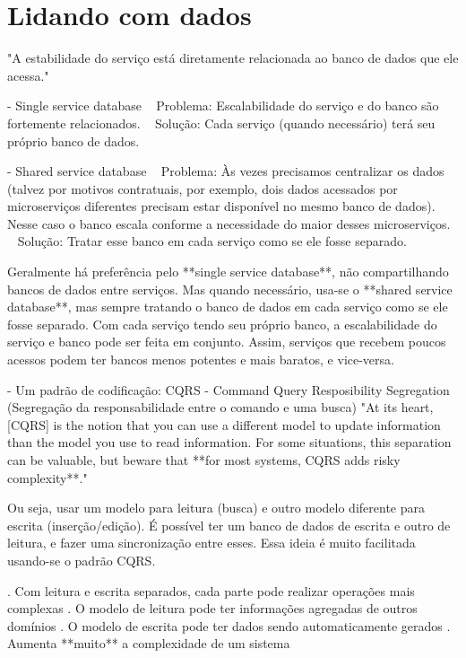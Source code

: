 \section{Lidando com dados}

"A estabilidade do serviço está diretamente relacionada ao banco de dados que ele acessa."

        - Single service database
            ~ Problema: Escalabilidade do serviço e do banco são fortemente relacionados.
            ~ Solução: Cada serviço (quando necessário) terá seu próprio banco de dados.

        - Shared service database
            ~ Problema: Às vezes precisamos centralizar os dados (talvez por motivos contratuais, por exemplo, dois dados acessados por microserviços diferentes precisam estar disponível no mesmo banco de dados). Nesse caso o banco escala conforme a necessidade do maior desses microserviços.
            ~ Solução: Tratar esse banco em cada serviço como se ele fosse separado.

        Geralmente há preferência pelo **single service database**, não compartilhando bancos de dados entre serviços. Mas quando necessário, usa-se o **shared service database**, mas sempre tratando o banco de dados em cada serviço como se ele fosse separado.
        Com cada serviço tendo seu próprio banco, a escalabilidade do serviço e banco pode ser feita em conjunto. Assim, serviços que recebem poucos acessos podem ter bancos menos potentes e mais baratos, e vice-versa.

        - Um padrão de codificação: CQRS - Command Query Resposibility Segregation (Segregação da responsabilidade entre o comando e uma busca)
            "At its heart, [CQRS] is the notion that you can use a different model to update information than the model you use to read information. For some situations, this separation can be valuable, but beware that **for most systems, CQRS adds risky complexity**."

           Ou seja, usar um modelo para leitura (busca) e outro modelo diferente para escrita (inserção/edição). É possível ter um banco de dados de escrita e outro de leitura, e fazer uma sincronização entre esses. Essa ideia é muito facilitada usando-se o padrão CQRS.
           
           . Com leitura e escrita separados, cada parte pode realizar operações mais complexas
           . O modelo de leitura pode ter informações agregadas de outros domínios
           . O modelo de escrita pode ter dados sendo automaticamente gerados
           . Aumenta **muito** a complexidade de um sistema

